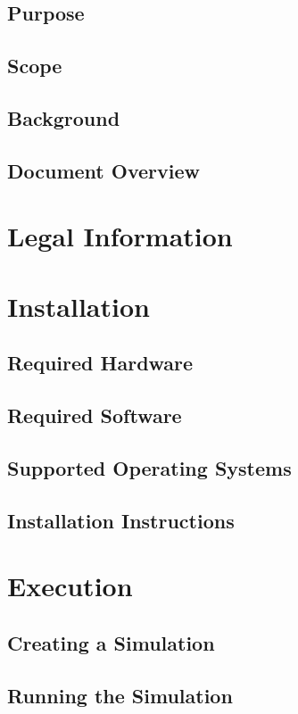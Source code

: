 \documentclass[12pt]{article}
\begin{document}
\subsection{Purpose} %
\subsection{Scope} %
\subsection{Background} %
\subsection{Document Overview} %

\section{Legal Information}	%

\section{Installation} %
\subsection{Required Hardware} %
\subsection{Required Software} %
\subsection{Supported Operating Systems} %
\subsection{Installation Instructions} %

\section{Execution} %
\subsection{Creating a Simulation} %
\subsection{Running the Simulation} %
\end{document}
